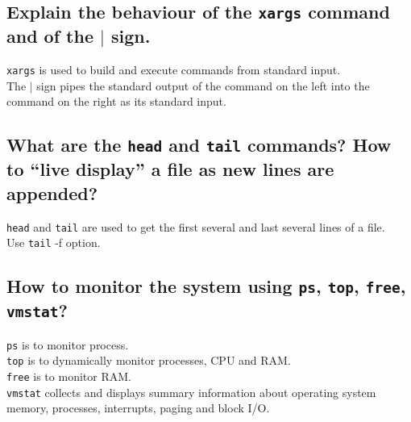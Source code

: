 \documentclass{article}
\begin{document}
\subsection{Explain the behaviour of the \texttt{xargs} command and of the $|$ sign.}
    \texttt{xargs} is used to build and execute commands from standard input. \\
    The $|$ sign pipes the standard output of the command on the left into the command on the right as its standard input.
\subsection{What are the \texttt{head} and \texttt{tail} commands? How to “live display” a file as new lines are appended?}
    \texttt{head} and \texttt{tail} are used to get the first several and last several lines of a file. \\
    Use \texttt{tail} -f option.
\subsection{How to monitor the system using \texttt{ps}, \texttt{top}, \texttt{free}, \texttt{vmstat}?}
    \texttt{ps} is to monitor process. \\
    \texttt{top} is to dynamically monitor processes, CPU and RAM. \\
    \texttt{free} is to monitor RAM. \\
    \texttt{vmstat} collects and displays summary information about operating system memory, processes, interrupts, paging and block I/O.
\end{document}

